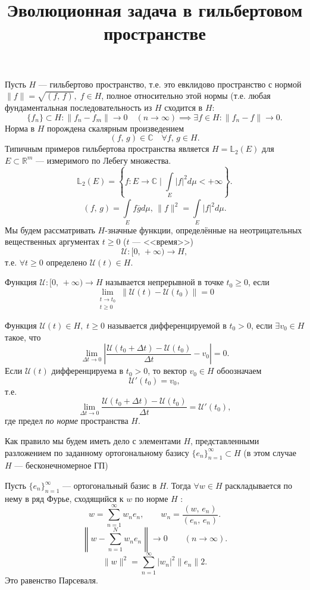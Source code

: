 \documentclass[a4paper]{article}
\title{Эволюционная задача в гильбертовом пространстве}
\begin{document}
	\maketitle
Пусть $H$ --- гильбертово пространство, т.\:е. это евклидово пространство с нормой $\|f\|=\sqrt{\left( f,\,f \right) },\; f \in H$,
полное относительно этой нормы  (т.\:е. любая фундаментальная
последовательность из $H$ сходится в $H$:
\[
	\{f_n\} \subset H: \|f_n-f_m\|\to 0 \quad(n\to \infty) \implies
	\exists f \in H: \|f_n-f\|\to 0
.\] 
Норма в $H$ порождена скалярным произведением
\[
	(f,\,g) \in \mathbb{C}\quad\forall f,\,g \in H 
.\]
Типичным примеров гильбертова пространства является
$
	H=\mathbb{L}_2 (E)
$ 
для $E \subset \mathbb{R}^m$ --- измеримого по Лебегу множества.
\[
	\mathbb{L}_2(E)= \left\{ f: E\to \mathbb{C}\mid 
	\int\limits_{E}^{} |f|^2d\mu < +\infty \right\}  
.\]
\[
	\left( f,\,g \right) =\int\limits_{E}^{} f \overline{g}
	d \mu,\, \|f\|^2= \int\limits_{E}^{} |f|^2 d\mu 
.\] 
Мы будем рассматривать $H$-значные функции, определённые на
неотрицательных вещественных аргументах $t\ge 0$ ($t$ --- <<время>>)
\[
	\mathcal{U}:[0,\,+\infty)\to H,
\] 
т.\:е. $\forall t \ge 0$ определено $\mathcal{U}(t) \in H$.

Функция $\mathcal{U}: [0,\,+\infty)\to H$ называется непрерывной в точке
$t_0\ge 0$, если \[\lim_{\substack{t \to t_0 \\ t\ge 0}} \|\mathcal{U}(t)-\mathcal{U}(t_0)\|=0\]

Функция $\mathcal{U}(t) \in H,\; t\ge 0$ называется дифференцируемой в 
$t_0>0$, если $\exists v_0 \in H$ такое, что
\[
	\lim_{\Delta t \to 0} \left| \frac{\mathcal{U}(t_0+\Delta t)-
\mathcal{U}	(t_0)}{\Delta t}-v_0 \right| =0
.\] 
Если $\mathcal{U}(t)$ дифференцируема в $t_0>0$, то вектор $v_0 \in H$ 
обоозначаем
\[
	\mathcal{U}'(t_0)=v_0,
\] 
т.\:е.
 \[
	 \lim_{\Delta t \to 0} \frac{\mathcal{U}(t_0+\Delta t)-
	 \mathcal{U}(t_0)}{\Delta t}= \mathcal{U}'(t_0),
\] 
где предел \emph{по норме} пространства $H$.

Как правило мы будем иметь дело с элементами $H$, представленными
разложением по заданному ортогональному базису $\{e_n\} _{n=1}^\infty\subset H$ (в этом случае $H$ --- бесконечномерное ГП)

Пусть $\{e_n\} _{n=1}^\infty$ --- ортогональный базис в $H$.
Тогда $\forall w \in  H$ раскладывается по нему в ряд Фурье,
сходящийся к $w$ по норме $H$ :
\[
	w=\sum_{n=1}^{\infty} w_n e_n, \qquad w_n =\frac{\left( 
	w,\, e_n\right) }{\left( e_n,\,e_n \right) }
.\] 
\[
	\left\lVert w- \sum_{n=1}^{N} w_n e_n\right\rVert\to 0 \qquad (n\to \infty).
\] 
\[
\| w\|^2 = \sum_{n=1}^{\infty} |w_n|^2 \| e_n\|2
.\]
Это равенство Парсеваля.
\end{document}
